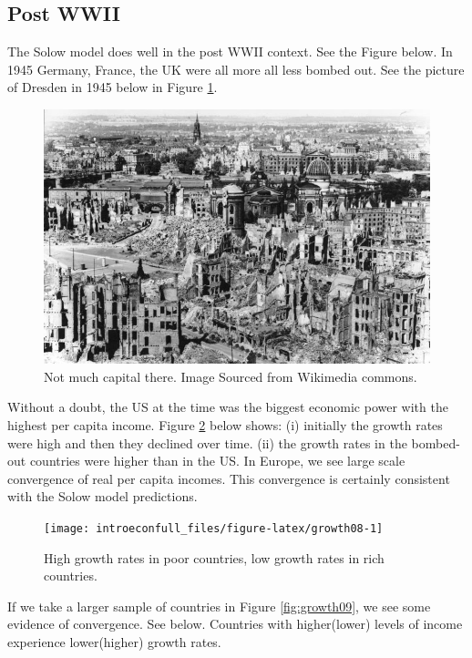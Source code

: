 \documentclass[
]{book}
\begin{document}
\hypertarget{post-wwii}{%
\subsection{Post WWII}\label{post-wwii}}

The Solow model does well in the post WWII context. See the Figure below. In 1945 Germany, France, the UK were all more all less bombed out. See the picture of Dresden in 1945 below in Figure \ref{fig:dresden1945}.

\begin{figure}

{\centering \includegraphics[width=0.5\linewidth]{img/growth/dresden1945} 

}

\caption{Not much capital there. Image Sourced from Wikimedia commons.}\label{fig:dresden1945}
\end{figure}

Without a doubt, the US at the time was the biggest economic power with the highest per capita income. Figure \ref{fig:growth08} below shows: (i) initially the growth rates were high and then they declined over time. (ii) the growth rates in the bombed-out countries were higher than in the US. In Europe, we see large scale convergence of real per capita incomes. This convergence is certainly consistent with the Solow model predictions.

\begin{figure}

{\centering \texttt{[image: introeconfull\_files/figure-latex/growth08-1]} 

}

\caption{High growth rates in poor countries, low growth rates in rich countries.}\label{fig:growth08}
\end{figure}

If we take a larger sample of countries in Figure \ref{fig:growth09}, we see some evidence of convergence. See below. Countries with higher(lower) levels of income experience lower(higher) growth rates.
\end{document}
